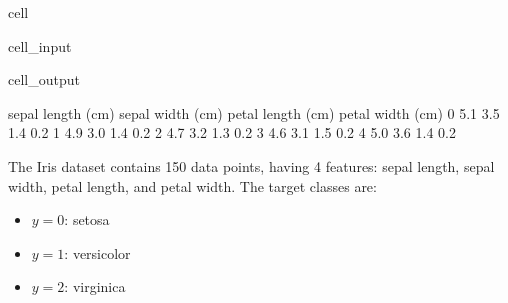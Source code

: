 \documentclass[letterpaper,10pt,english]{jupyterBook}
\begin{document}
\begin{sphinxuseclass}{cell}\begin{sphinxVerbatimInput}

\begin{sphinxuseclass}{cell_input}
\begin{sphinxVerbatim}[commandchars=\\\{\}]
   
   

  
   
   

\end{sphinxVerbatim}

\end{sphinxuseclass}\end{sphinxVerbatimInput}
\begin{sphinxVerbatimOutput}

\begin{sphinxuseclass}{cell_output}
\begin{sphinxVerbatim}[commandchars=\\\{\}]
   sepal length (cm)  sepal width (cm)  petal length (cm)  petal width (cm)
0                5.1               3.5                1.4               0.2
1                4.9               3.0                1.4               0.2
2                4.7               3.2                1.3               0.2
3                4.6               3.1                1.5               0.2
4                5.0               3.6                1.4               0.2
\end{sphinxVerbatim}

\end{sphinxuseclass}\end{sphinxVerbatimOutput}

\end{sphinxuseclass}
\sphinxAtStartPar
The Iris dataset contains 150 data points, having 4 features: sepal length, sepal width, petal length, and petal width. The target classes are:
\begin{itemize}
\item {} 
\sphinxAtStartPar
\(y=0\): setosa

\item {} 
\sphinxAtStartPar
\(y=1\): versicolor

\item {} 
\sphinxAtStartPar
\(y=2\): virginica

\end{itemize}
\end{document}
